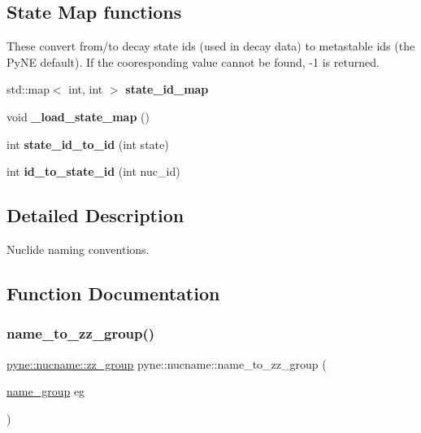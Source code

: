 \subsection*{State Map functions}
\label{_amgrp70bdf518b2e9e67e047a392686df556d}%
These convert from/to decay state ids (used in decay data) to metastable ids (the Py\+NE default). If the cooresponding value cannot be found, -\/1 is returned. \begin{DoxyCompactItemize}
\item 
\mbox{\label{namespacepyne_1_1nucname_a1bfcc87b4ac9c3f6634ea5a495871d7b}} 
std\+::map$<$ int, int $>$ {\bfseries state\+\_\+id\+\_\+map}
\item 
\mbox{\label{namespacepyne_1_1nucname_aa0f5efb8d3be5214acf8440dae8d4280}} 
void {\bfseries \+\_\+load\+\_\+state\+\_\+map} ()
\item 
\mbox{\label{namespacepyne_1_1nucname_a91e9f43c7bfd01149545704c0a0d003a}} 
int {\bfseries state\+\_\+id\+\_\+to\+\_\+id} (int state)
\item 
\mbox{\label{namespacepyne_1_1nucname_aacc2935da529ea5f25324c17a3fba2d4}} 
int {\bfseries id\+\_\+to\+\_\+state\+\_\+id} (int nuc\+\_\+id)
\end{DoxyCompactItemize}


\subsection{Detailed Description}
Nuclide naming conventions. 

\subsection{Function Documentation}
\mbox{\label{namespacepyne_1_1nucname_a0f6bd8d281ff5aa5fd5b48e16b867062}} 
\subsubsection{\texorpdfstring{name\+\_\+to\+\_\+zz\+\_\+group()}{name\_to\_zz\_group()}}
{\footnotesize\ttfamily \hyperlink{namespacepyne_1_1nucname_a2e9463e61005389bbc50bfa210061582}{pyne\+::nucname\+::zz\+\_\+group} pyne\+::nucname\+::name\+\_\+to\+\_\+zz\+\_\+group (\begin{DoxyParamCaption}\item[{\hyperlink{namespacepyne_1_1nucname_a8959cfbd85b0ccc8b51ca14e98de9791}{name\+\_\+group}}]{eg }\end{DoxyParamCaption})}

